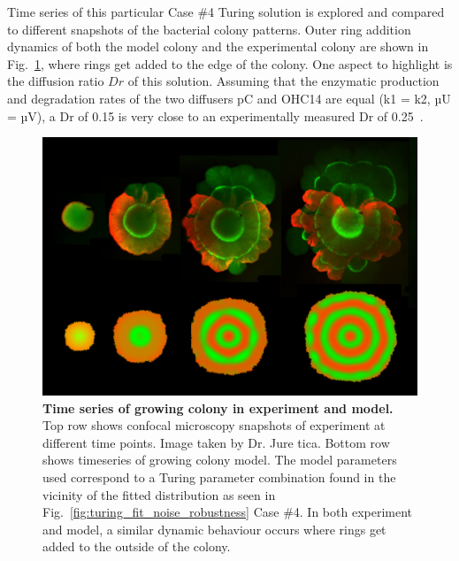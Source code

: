 Time series of this particular Case \#4 Turing solution is explored and compared to different snapshots of the bacterial colony patterns.
Outer ring addition dynamics of both the model colony and the experimental colony are shown in Fig.~\ref{fig:outer_ring_addition_modelvsexperiment}, where rings get added to the edge of the colony.
One aspect to highlight is the diffusion ratio $Dr$ of this solution.
Assuming that the enzymatic production and degradation rates of the two diffusers pC and OHC14 are equal (k1 = k2, µU = µV), a Dr of 0.15 is very close to an experimentally measured Dr of 0.25~\cite{tica_diffusers}.

\begin{figure}[H] %
    \centering
    \begin{adjustbox}{center}
        \includegraphics[width=1\textwidth]{chapters/Chapter 3/outer_ring_addition_modelvsexperiment} %
    \end{adjustbox}
    \caption{\textbf{Time series of growing colony in experiment and model.} Top row shows confocal microscopy snapshots of experiment at different time points. Image taken by Dr. Jure tica. Bottom row shows timeseries of growing colony model. The model parameters used correspond to a Turing parameter combination found in the vicinity of the fitted distribution as seen in Fig.~\ref{fig:turing_fit_noise_robustness} Case \#4. In both experiment and model, a similar dynamic behaviour occurs where rings get added to the outside of the colony.}
    \label{fig:outer_ring_addition_modelvsexperiment}
\end{figure}

